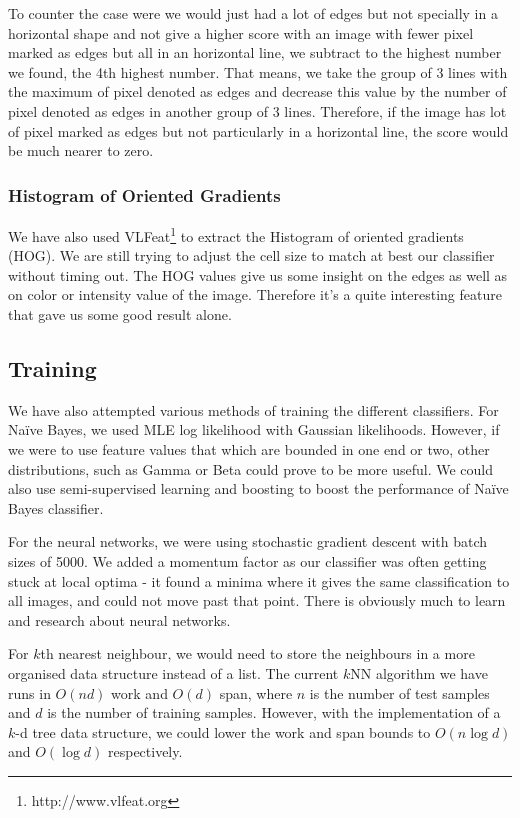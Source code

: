 \documentclass{article} %
\begin{document}
To counter the case were we would just had a lot of edges but not specially in a horizontal shape and not give a higher score with an image with fewer pixel marked as edges but all in an horizontal line, we subtract to the highest number we found, the 4th highest number. That means, we take the group of 3 lines with the maximum of pixel denoted as edges and decrease this value by the number of pixel denoted as edges in another group of 3 lines. Therefore, if the image has lot of pixel marked as edges but not particularly in a horizontal line, the score would be much nearer to zero. 

\subsubsection{Histogram of Oriented Gradients}
We have also used VLFeat\footnote{http://www.vlfeat.org} to extract the Histogram of oriented gradients (HOG).
We are still trying to adjust the cell size to match at best our classifier without timing out. 
The HOG values give us some insight on the edges as well as on color or intensity value of the image. Therefore it's a quite interesting feature that gave us some good result alone. 

\subsection{Training}
We have also attempted various methods of training the different classifiers. For Na\"ive Bayes, we used MLE log likelihood with Gaussian likelihoods. However, if we were to use feature values that which are bounded in one end or two, other distributions, such as Gamma or Beta could prove to be more useful. We could also use semi-supervised learning and boosting to boost the performance of Na\"ive Bayes classifier.

For the neural networks, we were using stochastic gradient descent with batch sizes of 5000. We added a momentum factor as our classifier was often getting stuck at local optima - it found a minima where it gives the same classification to all images, and could not move past that point. There is obviously much to learn and research about neural networks.

For $k$th nearest neighbour, we would need to store the neighbours in a more organised data structure instead of a list. The current $k$NN algorithm we have runs in $O(nd)$ work and $O(d)$ span, where $n$ is the number of test samples and $d$ is the number of training samples. However, with the implementation of a $k$-d tree data structure, we could lower the work and span bounds to $O(n\log d)$ and $O(\log d)$ respectively.
\end{document}
